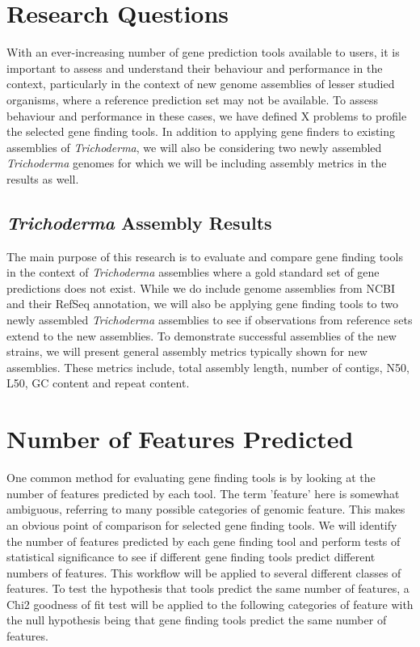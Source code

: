 \section{Research Questions}

With an ever-increasing number of gene prediction tools available to
users, it is important to assess and understand their behaviour and
performance in the context, particularly in the context of new genome
assemblies of lesser studied organisms, where a reference prediction
set may not be available. To assess behaviour and performance in these
cases, we have defined X problems to profile the selected gene finding
tools. In addition to applying gene finders to existing assemblies of
\textit{Trichoderma}, we will also be considering two newly assembled
\textit{Trichoderma} genomes for which we will be including assembly
metrics in the results as well.

\subsection{\textit{Trichoderma} Assembly Results}

The main purpose of this research is to evaluate and compare gene
finding tools in the context of \textit{Trichoderma} assemblies where
a gold standard set of gene predictions does not exist. While we do
include genome assemblies from NCBI and their RefSeq annotation, we
will also be applying gene finding tools to two newly assembled
\textit{Trichoderma} assemblies to see if observations from reference
sets extend to the new assemblies. To demonstrate successful
assemblies of the new strains, we will present general assembly
metrics typically shown for new assemblies. These metrics include,
total assembly length, number of contigs, N50, L50, GC content and
repeat content.

\section{Number of Features Predicted}

One common method for evaluating gene finding tools is by looking at
the number of features predicted by each tool. The term 'feature' here
is somewhat ambiguous, referring to many possible categories of
genomic feature. This makes an obvious point of comparison for
selected gene finding tools. We will identify the number of features
predicted by each gene finding tool and perform tests of statistical
significance to see if different gene finding tools predict different
numbers of features. This workflow will be applied to several
different classes of features. To test the hypothesis that tools
predict the same number of features, a Chi2 goodness of fit test will
be applied to the following categories of feature with the null
hypothesis being that gene finding tools predict the same number of
features.


